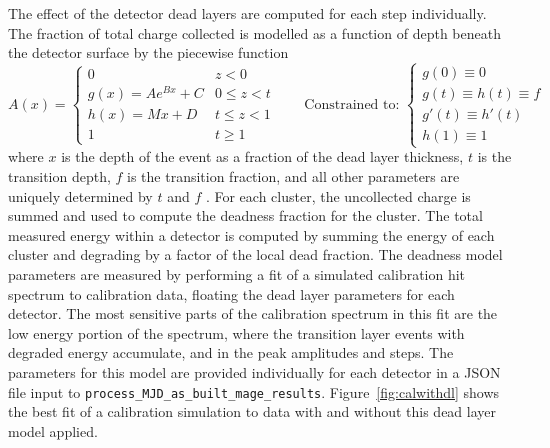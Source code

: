 \documentclass[/main.tex]{subfiles}
\begin{document}
The effect of the detector dead layers are computed for each step individually.
The fraction of total charge collected is modelled as a function of depth beneath the detector surface by the piecewise function
\begin{equation}
  \label{eq:dlmodel}
  A(x) = \begin{cases}
    0 & z < 0 \\
    g(x)=Ae^{Bx} + C & 0 \leq z < t \\
    h(x)=Mx + D & t \leq z < 1 \\
    1 & t \geq 1
  \end{cases}  \qquad
  \text{Constrained to: } \begin{cases}
    g(0)\equiv 0 \\ g(t)\equiv h(t)\equiv f \\ g'(t)\equiv h'(t) \\ h(1)\equiv 1
  \end{cases}
\end{equation}
where $x$ is the depth of the event as a fraction of the dead layer thickness, $t$ is the transition depth, $f$ is the transition fraction, and all other parameters are uniquely determined by $t$ and $f$ \cite{giovenetti2015phd}\cite{buuck2018}.
For each cluster, the uncollected charge is summed and used to compute the deadness fraction for the cluster.
The total measured energy within a detector is computed by summing the energy of each cluster and degrading by a factor of the local dead fraction.
The deadness model parameters are measured by performing a fit of a simulated  calibration hit spectrum to calibration data, floating the dead layer parameters for each detector.
The most sensitive parts of the calibration spectrum in this fit are the low energy portion of the spectrum, where the transition layer events with degraded energy accumulate, and in the peak amplitudes and steps.
The parameters for this model are provided individually for each detector in a JSON file input to \texttt{process\_MJD\_as\_built\_mage\_results}.
Figure~\ref{fig:calwithdl} shows the best fit of a  calibration simulation to data with and without this dead layer model applied.
\end{document}
